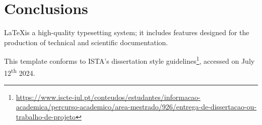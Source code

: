 \documentclass[12pt,reqno,twoside]{amsbook}
\begin{document}
\chapter{Conclusions}

\LaTeX\space is a high-quality typesetting system; it includes features designed for the production of technical and scientific documentation.

This template conforms to ISTA's dissertation style guidelines\footnote{\url{https://www.iscte-iul.pt/conteudos/estudantes/informacao-academica/percurso-academico/area-mestrado/926/entrega-de-dissertacao-ou-trabalho-de-projeto}}, accessed on July 12\textsuperscript{th} 2024.
\end{document}
